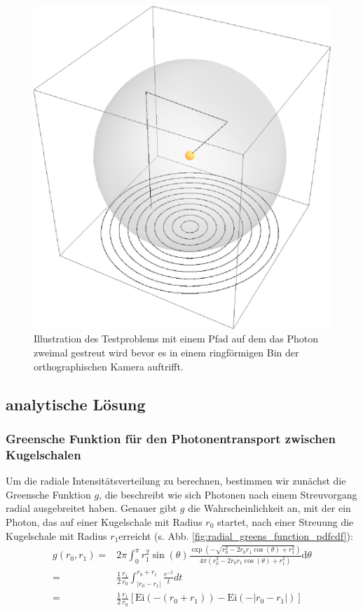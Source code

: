 	\begin{figure}
			\centering
			\includegraphics[height=0.3\textheight]{testproblem_illustration.eps}
			\caption{Illustration des Testproblems mit einem Pfad auf dem das Photon zweimal gestreut wird bevor es in einem ringförmigen Bin der orthographischen Kamera auftrifft.}
			\label{fig:testproblem_sketch}
	\end{figure}

	
	\subsection{analytische Lösung}\label{subsec:homsphere_analytic_solution}
	\subsubsection{Greensche Funktion für den Photonentransport zwischen Kugelschalen}
	Um die radiale Intensitätsverteilung zu berechnen, bestimmen wir zunächst die Greensche Funktion $g$, die beschreibt wie sich Photonen nach einem Streuvorgang radial ausgebreitet haben.
	Genauer gibt $g$ die Wahrscheinlichkeit an, mit der ein Photon, das auf einer Kugelschale mit Radius $r_0$ startet, nach einer Streuung die Kugelschale mit Radius $r_1$erreicht (s. Abb. \ref{fig:radial_greens_function_pdfcdf}):
	\begin{align*}
		g(r_0,r_1) =& 2 \pi \int_0^\pi r_1^2 \sin(\theta) \frac{\exp\left(-\sqrt{r_0^2-2 r_0 r_1 \cos(\theta)+r_1^2}\right)}{4 \pi (r_0^2-2 r_0 r_1 \cos(\theta)+r_1^2)} \text{d}\theta \\
		=& \frac{1}{2}\frac{r_1}{r_0} \int_{|r_0-r_1|}^{r_0+r_1} \frac{e^{-t}}{t} dt \\
		=& \frac{1}{2}\frac{r_1}{r_0}\left[\text{Ei}(-(r_0+r_1)) - \text{Ei}(-|r_0-r_1|)\right]
	\end{align*}
	
